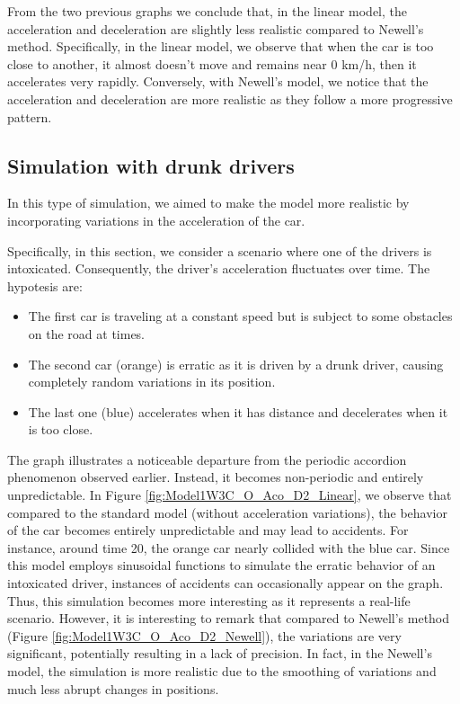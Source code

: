 \documentclass{article}
\begin{document}
		From the two previous graphs we conclude that, in the linear model, the acceleration and deceleration are slightly less realistic compared to Newell's method. Specifically, in the linear model, we observe that when the car is too close to another, it almost doesn't move and remains near 0 km/h, then it accelerates very rapidly. Conversely, with Newell's model, we notice that the acceleration and deceleration are more realistic as they follow a more progressive pattern.
		
		\subsection{Simulation with drunk drivers}
		
		In this type of simulation, we aimed to make the model more realistic by incorporating variations in the acceleration of the car.
		
		Specifically, in this section, we consider a scenario where one of the drivers is intoxicated. Consequently, the driver's acceleration fluctuates over time. The hypotesis are: 
		\begin{itemize}
			\item The first car is traveling at a constant speed but is subject to some obstacles on the road at times.
			\item The second car (orange) is erratic as it is driven by a drunk driver, causing completely random variations in its position.
			\item The last one (blue) accelerates when it has distance and decelerates when it is too close.
		\end{itemize}
		The graph illustrates a noticeable departure from the periodic accordion phenomenon observed earlier. Instead, it becomes non-periodic and entirely unpredictable. In Figure \ref{fig:Model1W3C_O_Aco_D2_Linear}, we observe that compared to the standard model (without acceleration variations), the behavior of the car becomes entirely unpredictable and may lead to accidents. For instance, around time 20, the orange car nearly collided with the blue car. Since this model employs sinusoidal functions to simulate the erratic behavior of an intoxicated driver, instances of accidents can occasionally appear on the graph. Thus, this simulation becomes more interesting as it represents a real-life scenario. However, it is interesting to remark that compared to Newell's method (Figure \ref{fig:Model1W3C_O_Aco_D2_Newell}), the variations are very significant, potentially resulting in a lack of precision. In fact, in the Newell's model, the simulation is more realistic due to the smoothing of variations and much less abrupt changes in positions.
		
\end{document}
